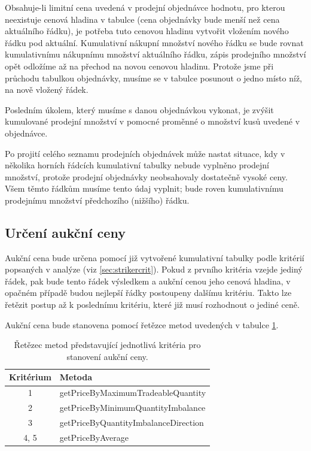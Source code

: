\documentclass[thesis=M,czech]{FITthesis}[2012/06/26]
\begin{document}
Obsahuje-li limitní cena uvedená v prodejní objednávce hodnotu, pro kterou neexistuje cenová hladina v tabulce (cena 
objednávky bude menší než cena aktuálního řádku), je potřeba tuto cenovou hladinu vytvořit vložením nového řádku pod aktuální. 
Kumulativní nákupní množství nového řádku se bude rovnat kumulativnímu nákupnímu množství aktuálního řádku, zápis prodejního 
množství opět odložíme až na přechod na novou cenovou hladinu. Protože jsme při průchodu tabulkou  objednávky, 
musíme se v tabulce posunout o jedno místo níž, na nově vložený řádek.

Posledním úkolem, který musíme s danou objednávkou vykonat, je zvýšit kumulované prodejní množství v pomocné proměnné 
o množství kusů uvedené v objednávce. 

Po projití celého seznamu prodejních objednávek může nastat situace, kdy v několika horních řádcích kumulativní tabulky nebude vyplněno 
prodejní množství, protože prodejní objednávky neobsahovaly dostatečně vysoké ceny. Všem těmto řádkům musíme tento údaj vyplnit; 
bude roven kumulativnímu prodejnímu množství předchozího (nižšího) řádku. 



\subsection{Určení aukční ceny}

Aukční cena bude určena pomocí již vytvořené kumulativní tabulky podle kritérií popsaných v analýze (viz \ref{sec:strikercrit}). 
Pokud z prvního kritéria vzejde jediný řádek, pak bude tento řádek výsledkem a aukční cenou jeho cenová hladina, v opačném 
případě budou nejlepší řádky postoupeny dalšímu kritériu. Takto lze řetězit postup až k poslednímu kritériu, které již musí 
rozhodnout o jediné ceně.

Aukční cena bude stanovena pomocí řetězce metod uvedených v tabulce \ref{tab:strikerchain}.

\begin{table}\centering
	\begin{tabular}{| c | l |}\hline
		Kritérium	& Metoda						\tabularnewline \hline \hline
		1	 	& getPriceByMaximumTradeableQuantity	\tabularnewline \hline
		2		& getPriceByMinimumQuantityImbalance	\tabularnewline \hline
		3		& getPriceByQuantityImbalanceDirection	\tabularnewline \hline
   		4, 5	 	& getPriceByAverage				\tabularnewline \hline
	\end{tabular}
	\caption[Metody pro stanovení aukční ceny]{Řetězec metod představující jednotlivá kritéria pro stanovení aukční ceny.}
	\label{tab:strikerchain}
\end{table}
\end{document}
